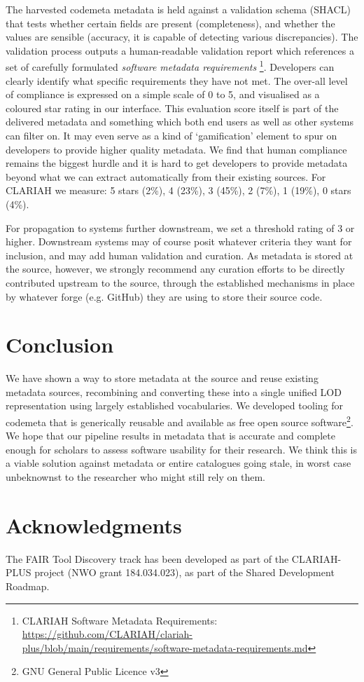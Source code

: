 \documentclass[a4paper,11pt]{article}
\begin{document}
The harvested codemeta metadata is held against a validation
schema (SHACL) that tests whether certain fields are
present (completeness), and whether the values are sensible (accuracy, it is
capable of detecting various discrepancies). The validation process outputs a
human-readable validation report which references a set of carefully formulated
\emph{software metadata requirements} \footnote{CLARIAH Software Metadata
Requirements:
\url{https://github.com/CLARIAH/clariah-plus/blob/main/requirements/software-metadata-requirements.md}}.
Developers can clearly identify what specific requirements they have not met.
The over-all level of compliance is expressed on a simple scale of 0 to 5, and
visualised as a coloured star rating in our interface. This evaluation score
itself is part of the delivered metadata and something which both end users as
well as other systems can filter on. It may even serve as a kind of
`gamification' element to spur on developers to provide higher quality
metadata. We find that human compliance remains the biggest hurdle and it is
hard to get developers to provide metadata beyond what we can extract
automatically from their existing sources. For CLARIAH we measure: 5 stars
(2\%), 4 (23\%), 3 (45\%), 2 (7\%), 1 (19\%), 0 stars (4\%).

For propagation to systems further downstream, we set a threshold rating of 3
or higher. Downstream systems may of course posit whatever criteria they want
for inclusion, and may add human validation and curation. As metadata is stored
at the source, however, we strongly recommend any curation efforts to be
directly contributed upstream to the source, through the established mechanisms
in place by whatever forge (e.g. GitHub) they are using to store their source
code.

\section{Conclusion}

We have shown a way to store metadata at the source and reuse existing metadata
sources, recombining and converting these into a single unified LOD
representation using largely established vocabularies. We developed tooling for
codemeta that is generically reusable and available as free open source
software\footnote{GNU General Public Licence v3}. We hope that our pipeline
results in metadata that is accurate and complete enough for scholars to assess
software usability for their research. We think this is a viable solution
against metadata or entire catalogues going stale, in worst
case unbeknownst to the researcher who might still rely on them.

\section*{Acknowledgments}

The FAIR Tool Discovery track has been developed as part of the CLARIAH-PLUS
project (NWO grant 184.034.023), as part of the Shared Development Roadmap.

\printbibliography
\end{document}
